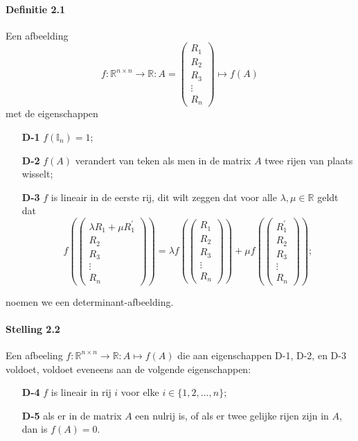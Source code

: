 \documentclass[11pt,oneside,a4paper]{article}
\begin{document}
	\paragraph{Definitie 2.1}
		Een afbeelding $$f: \mathbb{R}^{n \times n} \to \mathbb{R}: A = \begin{pmatrix}
			R_1 \\ R_2 \\ R_3 \\ \vdots \\ R_n
		\end{pmatrix} \mapsto f(A)$$ met de eigenschappen
		\begin{itemize}
			\item[\textbf{D-1}] $f(\mathbb{I}_n) = 1$;
			\item[\textbf{D-2}] $f(A)$ verandert van teken als men in de matrix $A$ twee rijen van plaats wisselt;
			\item[\textbf{D-3}] $f$ is lineair in de eerste rij, dit wilt zeggen dat voor alle $\lambda , \mu \in \mathbb{R}$ geldt dat
			$$f(\begin{pmatrix}
				\lambda R_1 + \mu R_1^{'} \\ R_2 \\ R_3 \\ \vdots \\ R_n
			\end{pmatrix}) = \lambda f(\begin{pmatrix}
			R_1 \\ R_2 \\ R_3 \\ \vdots \\ R_n \end{pmatrix}) + \mu f(\begin{pmatrix}
			R_1^{'} \\ R_2 \\ R_3 \\ \vdots \\ R_n \end{pmatrix});$$
		\end{itemize}
		noemen we een determinant-afbeelding.
	\paragraph{Stelling 2.2}
		Een afbeeling $f: \mathbb{R}^{n \times n} \to \mathbb{R}: A \mapsto f(A)$ die aan eigenschappen D-1, D-2, en D-3 voldoet, voldoet eveneens aan de volgende eigenschappen:
		\begin{itemize}
			\item[\textbf{D-4}] $f$ is lineair in rij $i$ voor elke $i \in \{1,2,\ldots ,n\}$;
			\item[\textbf{D-5}] als er in de matrix $A$ een nulrij is, of als er twee gelijke rijen zijn in $A$, dan is $f(A) = 0$.
		\end{itemize}
\end{document}

